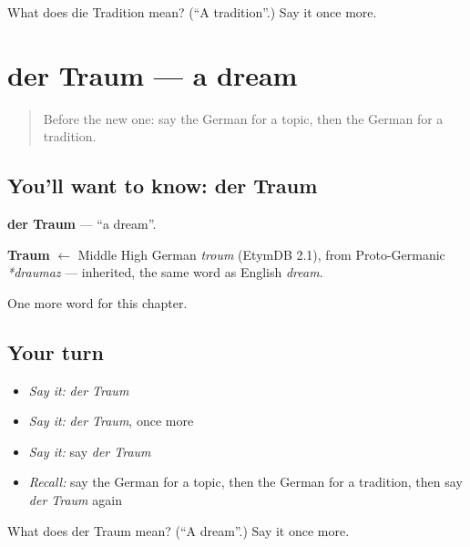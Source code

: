 \begin{tcolorbox}[breakable,colback=teal!4,colframe=teal!35!black,title={Before you move on}]
What does die Tradition mean? (\textquotedblleft{}A tradition\textquotedblright{}.) Say it once more.
\end{tcolorbox}
\section[der Traum]{der Traum — a dream}

\label{lesson:GE-C240-traum}



\begin{quote}
Before the new one: say the German for a topic, then the German for a tradition.
\end{quote}

\subsection*{You'll want to know: der Traum}
\textbf{der Traum} — \textquotedblleft{}a dream\textquotedblright{}.

\begin{cousinweb}
\textbf{Traum} $\leftarrow$ Middle High German \emph{troum} (EtymDB 2.1), from Proto-Germanic \emph{*draumaz} — inherited, the same word as English \emph{dream}.
\end{cousinweb}

\begin{grammarlens}[title={What you've built}]
One more word for this chapter.
\end{grammarlens}

\subsection*{Your turn}
\begin{itemize}
\raggedright
  \item \emph{Say it:} \emph{der Traum}
  \item \emph{Say it:} \emph{der Traum}, once more
  \item \emph{Say it:} say \emph{der Traum}
  \item \emph{Recall:} say the German for a topic, then the German for a tradition, then say \emph{der Traum} again
\end{itemize}

\begin{tcolorbox}[breakable,colback=teal!4,colframe=teal!35!black,title={Before you move on}]
What does der Traum mean? (\textquotedblleft{}A dream\textquotedblright{}.) Say it once more.
\end{tcolorbox}
